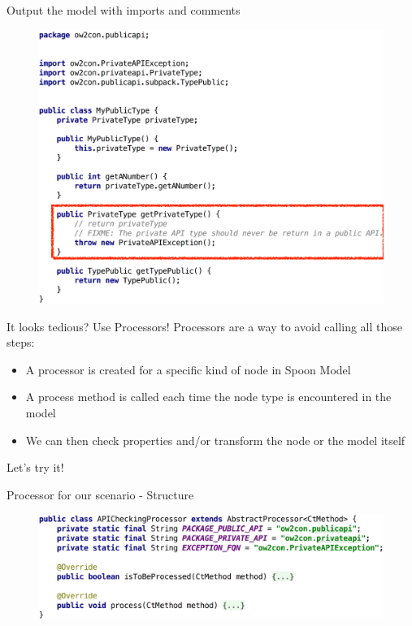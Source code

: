 \documentclass{beamer}
\begin{document}
\begin{frame}{Output the model with imports and comments}

\begin{figure}
\centering
\includegraphics[width=\textwidth]{figures/output/scenario-result-2.pdf}
\end{figure}

\end{frame}

\begin{frame}{It looks tedious? Use Processors!}
Processors are a way to avoid calling all those steps: 

\begin{itemize}
\item A processor is created for a specific kind of node in Spoon Model
\item A process method is called each time the node type is encountered in the model
\item We can then check properties and/or transform the node or the model itself
\end{itemize}

Let's try it!
\end{frame}

\begin{frame}{Processor for our scenario - Structure}

\begin{figure}
\centering
\includegraphics[width=\textwidth]{figures/processor/processor-structure.pdf}
\end{figure}
\end{frame}
\end{document}
